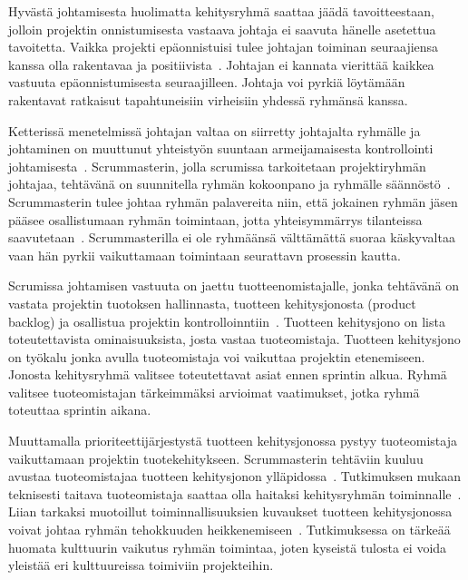 \documentclass[finnish]{tktltiki2}
\theoremstyle{definition}
\theoremstyle{remark}
\begin{document}
Hyvästä johtamisesta huolimatta kehitysryhmä saattaa jäädä tavoitteestaan, jolloin projektin onnistumisesta vastaava johtaja ei saavuta hänelle asetettua tavoitetta. Vaikka projekti epäonnistuisi tulee johtajan toiminan seuraajiensa kanssa olla rakentavaa ja positiivista~\cite{raccoon2006leadership}. Johtajan ei kannata vierittää kaikkea vastuuta epäonnistumisesta seuraajilleen. Johtaja voi pyrkiä löytämään rakentavat ratkaisut tapahtuneisiin virheisiin yhdessä ryhmänsä kanssa.

Ketterissä menetelmissä johtajan valtaa on siirretty johtajalta ryhmälle ja johtaminen on muuttunut yhteistyön suuntaan armeijamaisesta kontrollointi johtamisesta~\cite{Nerur:2005:CMA:1060710.1060712}. Scrummasterin, jolla scrumissa tarkoitetaan projektiryhmän johtajaa, tehtävänä on suunnitella ryhmän kokoonpano ja ryhmälle säännöstö~\cite{4755768}. Scrummasterin tulee johtaa ryhmän palavereita niin, että jokainen ryhmän jäsen pääsee osallistumaan ryhmän toimintaan, jotta yhteisymmärrys tilanteissa saavutetaan~\cite{bradley1997effect}. Scrummasterilla ei ole ryhmäänsä välttämättä suoraa käskyvaltaa vaan hän pyrkii vaikuttamaan toimintaan seurattavn prosessin kautta.

Scrumissa johtamisen vastuuta on jaettu tuotteenomistajalle, jonka tehtävänä on vastata projektin tuotoksen hallinnasta, tuotteen kehitysjonosta (product backlog) ja osallistua projektin kontrolloinntiin~\cite{4755768}. Tuotteen kehitysjono on lista toteutettavista ominaisuuksista, josta vastaa tuoteomistaja. Tuotteen kehitysjono on työkalu jonka avulla tuoteomistaja voi vaikuttaa projektin etenemiseen. Jonosta kehitysryhmä valitsee toteutettavat asiat ennen sprintin alkua. Ryhmä valitsee tuoteomistajan tärkeimmäksi arvioimat vaatimukset, jotka ryhmä toteuttaa sprintin aikana. 

Muuttamalla prioriteettijärjestystä tuotteen kehitysjonossa pystyy tuoteomistaja vaikuttamaan projektin tuotekehitykseen. Scrummasterin tehtäviin kuuluu avustaa tuoteomistajaa tuotteen kehitysjonon ylläpidossa~\cite{Nerur:2005:CMA:1060710.1060712}. Tutkimuksen mukaan teknisesti taitava tuoteomistaja saattaa olla haitaksi kehitysryhmän toiminnalle~\cite{Nerur:2005:CMA:1060710.1060712}. Liian tarkaksi muotoillut toiminnallisuuksien kuvaukset tuotteen kehitysjonossa voivat johtaa ryhmän tehokkuuden heikkenemiseen~\cite{Nerur:2005:CMA:1060710.1060712}. Tutkimuksessa on tärkeää huomata kulttuurin vaikutus ryhmän toimintaa, joten kyseistä tulosta ei voida yleistää eri kulttuureissa toimiviin projekteihin.
\end{document}
